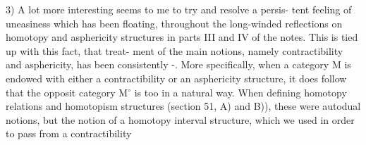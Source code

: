 3) A lot more interesting seems to me to try and resolve a persis-%
tent feeling of uneasiness which has been floating, throughout the
long-winded reflections on homotopy and asphericity structures in parts
III and IV of the notes. This is tied up with this fact, that  treat-%
ment of the main notions, namely contractibility and asphericity, has
been consistently \hand{\uline{\textcolor{black}{non}}} \hand{\uline{\textcolor{black}{auto}}}-\hand{\uline{\textcolor{black}{dual}}}. More specifically, when a category M
is endowed with either a contractibility or an asphericity structure,
it does \hand{\uline{\textcolor{black}{not}}} follow that the opposit category M$^{\circ}$ is too in a natural way.
When defining homotopy relations and homotopism structures (section 51,
A) and B)), these were autodual notions, but the notion of a homotopy
interval structure, which we used in order to pass from a contractibility

